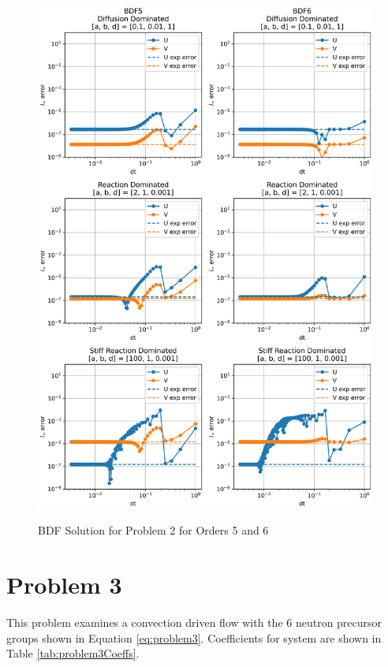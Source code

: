 \begin{figure}[t]
  \centering
  \includegraphics[width=5.75in]{images/BDF5BDF6problem2.png}\\
  \caption{BDF Solution for Problem 2 for Orders 5 and 6}
  \label{fig:errorProblem2BDF5and6}
\end{figure} 

\FloatBarrier


\section{Problem 3}
This problem examines a convection driven flow with the 6 neutron precursor groups shown in Equation \ref{eq:problem3}. Coefficients for system are shown in Table \ref{tab:problem3Coeffs}. 


